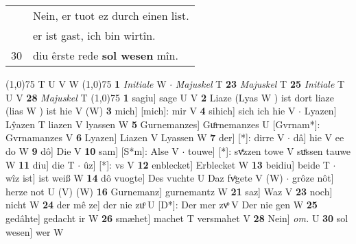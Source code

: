 \documentclass[8pt,a4paper,notitlepage]{article}
\begin{document}
\begin{table}[ht]
\begin{minipage}[t]{0.5\linewidth}
\begin{tabular}{rl}
 & Nein, er tuot ez durch einen list.\\ 
 & er ist gast, ich bin wirtîn.\\ 
30 & diu êrste rede \textbf{sol wesen} mîn.\\ 
\end{tabular}
\scriptsize
\line(1,0){75} \newline
T U V W \newline
\line(1,0){75} \newline
\textbf{1} \textit{Initiale} W   $\cdot$ \textit{Majuskel} T  \textbf{23} \textit{Majuskel} T  \textbf{25} \textit{Initiale} T U V  \textbf{28} \textit{Majuskel} T  \newline
\line(1,0){75} \newline
\textbf{1} sagiu] sage U V \textbf{2} Liaze (Lyas W ) ist dort liaze (lias W ) ist hie V (W) \textbf{3} mich] [mich]: mir V \textbf{4} sihich] sich ich hie V  $\cdot$ Lyazen] Lŷazen T liazen V lyassen W \textbf{5} Gurnemanzes] Guͦrnemanzes U [Gvrnam*]: Gvrnamanzes V \textbf{6} Lyazen] Liazen V Lyassen W \textbf{7} der] [*]: dirre V  $\cdot$ dâ] hie V ee do W \textbf{9} dô] Die V \textbf{10} sam] [S*m]: Alse V  $\cdot$ touwe] [*]: svͤzzen towe V suͤssen tauwe W \textbf{11} diu] die T  $\cdot$ ûz] [*]: vs V \textbf{12} enblecket] Erblecket W \textbf{13} beidiu] beide T  $\cdot$ wîz ist] ist weiß W \textbf{14} dô vuogte] Des vuchte U Daz fvͦgete V (W)  $\cdot$ grôze nôt] herze not U (V) (W) \textbf{16} Gurnemanz] gurnemantz W \textbf{21} saz] Waz V \textbf{23} noch] nicht W \textbf{24} der mê ze] der nie zuͦ U [D*]: Der mer zvͦ V Der nie gen W \textbf{25} gedâhte] gedacht ir W \textbf{26} smæhet] machet T versmahet V \textbf{28} Nein] \textit{om.} U \textbf{30} sol wesen] wer W \newline
\end{minipage}
\end{table}
\end{document}
